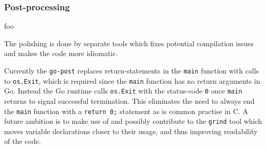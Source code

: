 
\subsubsection{Post-processing}


foo

The polishing is done by separate tools which fixes potential compilation issues and makes the code more idiomatic.

Currently the \texttt{go-post} replaces return-statements in the \texttt{main} function with calls to \texttt{os.Exit}, which is required since the \texttt{main} function has no return arguments in Go. Instead the Go runtime calls \texttt{os.Exit} with the status-code \texttt{0} once \texttt{main} returns to signal successful termination. This eliminates the need to always end the \texttt{main} function with a \texttt{return 0;} statement as is common practise in C. A future ambition is to make use of and possibly contribute to the \texttt{grind} tool which moves variable declarations closer to their usage, and thus improving readability of the code.
